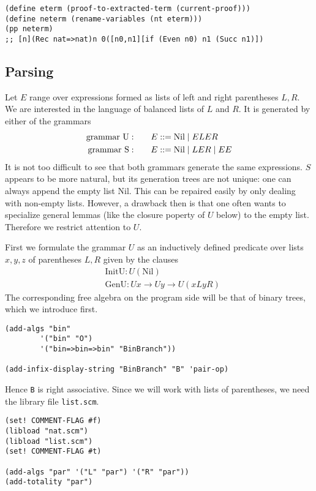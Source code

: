 \documentclass[12pt]{amsart}
\newcommand{\nil}{\mathrm{Nil}}
\newcommand{\BNFdef}{\mathtt{\; ::= \;}}
\newcommand{\BNFor}{\mid}
\begin{document}
\begin{appendix}
\begin{verbatim}
(define eterm (proof-to-extracted-term (current-proof)))
(define neterm (rename-variables (nt eterm)))
(pp neterm)
;; [n](Rec nat=>nat)n 0([n0,n1][if (Even n0) n1 (Succ n1)])
\end{verbatim}

\subsection{Parsing}
\label{SS:Parsing}
Let $E$ range over expressions formed as lists of left and right
parentheses $L,R$.  We are interested in the \cite{Dyck82}
language of balanced lists of $L$ and $R$.  It is generated by either
of the grammars
\begin{align*}
  \hbox{grammar U}: &\qquad E \BNFdef \nil \BNFor ELER
  \\
  \hbox{grammar S}: &\qquad E \BNFdef \nil \BNFor LER \BNFor EE
\end{align*}
It is not too difficult to see that both grammars generate the same
expressions.  $S$ appears to be more natural, but its generation trees
are not unique: one can always append the empty list $\nil$.  This can
be repaired easily by only dealing with non-empty lists.  However, a
drawback then is that one often wants to specialize general lemmas
(like the closure poperty of $U$ below) to the empty list.  Therefore
we restrict attention to $U$.

First we formulate the grammar $U$ as an inductively defined predicate
over lists $x,y,z$ of parentheses $L,R$ given by the clauses
\begin{align*}
  & \mathrm{InitU} \colon U (\nil)
  \\
  & \mathrm{GenU} \colon U x \to U y \to U(xLyR)
\end{align*}
The corresponding free algebra on the program side will be that
of binary trees, which we introduce first.
\begin{verbatim}
(add-algs "bin"
        '("bin" "O")
        '("bin=>bin=>bin" "BinBranch"))

(add-infix-display-string "BinBranch" "B" 'pair-op)
\end{verbatim}
Hence \verb|B| is right associative.  Since we will work with lists
of parentheses, we need the library file \verb|list.scm|.
\begin{verbatim}
(set! COMMENT-FLAG #f)
(libload "nat.scm")
(libload "list.scm")
(set! COMMENT-FLAG #t)

(add-algs "par" '("L" "par") '("R" "par"))
(add-totality "par")


\end{verbatim}
\end{appendix}
\end{document}
